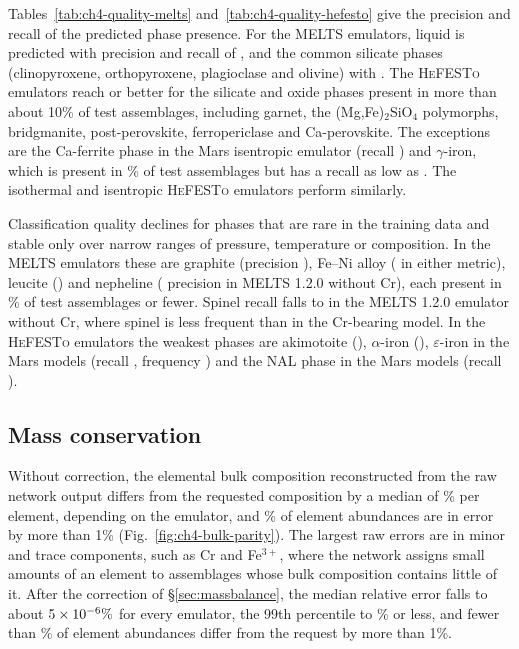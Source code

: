 Tables~\ref{tab:ch4-quality-melts} and~\ref{tab:ch4-quality-hefesto} give the precision and recall of the predicted phase presence.
For the \textsc{MELTS} emulators, liquid is predicted with precision and recall of \PresLiquidRange{}, and the common silicate phases
(clinopyroxene, orthopyroxene, plagioclase and olivine) with \PresMeltsCommonRange{}. The \textsc{HeFESTo} emulators reach \PresHefFloor{} or better for the
silicate and oxide phases present in more than about 10\% of test assemblages, including garnet, the (Mg,Fe)$_2$SiO$_4$
polymorphs, bridgmanite, post-perovskite, ferropericlase and Ca-perovskite. The exceptions are the Ca-ferrite phase in the Mars
isentropic emulator (recall \PresCaFerriteMarsIsenRecall) and $\gamma$-iron, which is present in \PresGammaFreqRange\% of test assemblages but has a recall as low as
\PresGammaRecallLow. The isothermal and isentropic \textsc{HeFESTo} emulators perform similarly.

Classification quality declines for phases that are rare in the training data and stable only over narrow ranges of pressure,
temperature or composition. In the \textsc{MELTS} emulators these are graphite (precision \PresGraphitePrec), Fe--Ni alloy (\PresAlloyRange{} in
either metric), leucite (\PresLeuciteRange) and nepheline (\PresNephelinePrec{} precision in \textsc{MELTS} 1.2.0 without Cr), each present in \PresRareFreqMax\% of test
assemblages or fewer. Spinel recall falls to \PresSpinelRecallNoCr{} in the \textsc{MELTS} 1.2.0 emulator without Cr, where spinel is less frequent than
in the Cr-bearing model. In the \textsc{HeFESTo} emulators the weakest phases are akimotoite (\PresAkimotoiteRange), $\alpha$-iron
(\PresAlphaIronRange), $\varepsilon$-iron in the Mars models (recall \PresEpsRecallMars, frequency \PresEpsFreqMars) and the NAL phase in the Mars models (recall
\PresNalRecallMars).

\subsection{Mass conservation}\label{ch4-results-mass}

Without correction, the elemental bulk composition reconstructed from the raw network output differs from the requested
composition by a median of \MassRawMedianRange\% per element, depending on the emulator, and \MassRawFracRange\% of element abundances are in error by
more than 1\% (Fig.~\ref{fig:ch4-bulk-parity}). The largest raw errors are in minor and trace components, such as Cr and Fe$^{3+}$,
where the network assigns small amounts of an element to assemblages whose bulk composition contains little of it. After the
correction of \S\ref{sec:massbalance}, the median relative error falls to about $5\times10^{-6}\%$ for every emulator, the 99th
percentile to \MassMBPNinetyNine\% or less, and fewer than \MassMBFracGtOne\% of element abundances differ from the request by more than 1\%.

